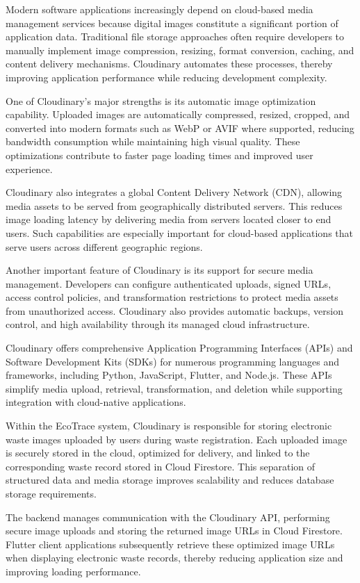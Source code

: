 Modern software applications increasingly depend on cloud-based media
management services because digital images constitute a significant portion of
application data. Traditional file storage approaches often require developers to
manually implement image compression, resizing, format conversion, caching,
and content delivery mechanisms. Cloudinary automates these processes, thereby
improving application performance while reducing development complexity.

One of Cloudinary's major strengths is its automatic image optimization
capability. Uploaded images are automatically compressed, resized, cropped, and
converted into modern formats such as WebP or AVIF where supported, reducing
bandwidth consumption while maintaining high visual quality. These
optimizations contribute to faster page loading times and improved user
experience.

Cloudinary also integrates a global Content Delivery Network (CDN), allowing
media assets to be served from geographically distributed servers. This reduces
image loading latency by delivering media from servers located closer to end
users. Such capabilities are especially important for cloud-based applications that
serve users across different geographic regions.

Another important feature of Cloudinary is its support for secure media
management. Developers can configure authenticated uploads, signed URLs,
access control policies, and transformation restrictions to protect media assets
from unauthorized access. Cloudinary also provides automatic backups, version
control, and high availability through its managed cloud infrastructure.

Cloudinary offers comprehensive Application Programming Interfaces (APIs)
and Software Development Kits (SDKs) for numerous programming languages and
frameworks, including Python, JavaScript, Flutter, and Node.js. These APIs
simplify media upload, retrieval, transformation, and deletion while supporting
integration with cloud-native applications.

Within the EcoTrace system, Cloudinary is responsible for storing electronic
waste images uploaded by users during waste registration. Each uploaded image
is securely stored in the cloud, optimized for delivery, and linked to the
corresponding waste record stored in Cloud Firestore. This separation of
structured data and media storage improves scalability and reduces database
storage requirements.

The backend manages communication with the Cloudinary API, performing
secure image uploads and storing the returned image URLs in Cloud Firestore.
Flutter client applications subsequently retrieve these optimized image URLs
when displaying electronic waste records, thereby reducing application size and
improving loading performance.

